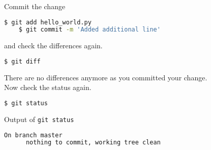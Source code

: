 \begin{frame}[fragile]
\emptyframetitle

  Commit the change 

  \begin{lstlisting}[language=bash]
    $ git add hello_world.py
    $ git commit -m 'Added additional line'
  \end{lstlisting}

  and check the differences again.

  \begin{lstlisting}[language=bash]
    $ git diff
  \end{lstlisting}

  There are no differences anymore as you committed your change.\\[0.25cm]

  Now check the status again.

  \begin{lstlisting}[language=bash]
    $ git status
  \end{lstlisting}
  \vspace*{-0.25cm}
  \begin{block}{Output of \texttt{git status}}
    \begin{lstlisting}[language=bash]
      On branch master
      nothing to commit, working tree clean
    \end{lstlisting}
  \end{block}

\end{frame}

